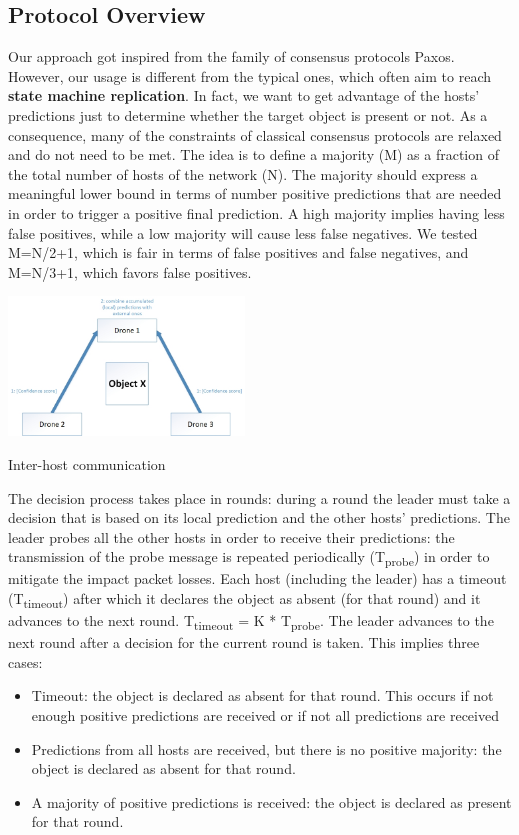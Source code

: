 \documentclass[10pt,conference,compsocconf]{IEEEtran}
\begin{document}
\subsection{Protocol Overview}
\label{subsec:protooverview}
Our approach got inspired from the family of consensus protocols Paxos. However, our usage is different from the typical ones, which often aim to reach \textbf{state machine replication}. In fact, we want to get advantage of the hosts' predictions just to determine whether the target object is present or not. As a consequence, many of the constraints of classical consensus protocols are relaxed and do not need to be met. The idea is to define a majority (M) as a fraction of the total number of hosts of the network (N). The majority should express a meaningful lower bound in terms of number positive predictions that are needed in order to trigger a positive final prediction. A high majority implies having less false positives, while a low majority will cause less false negatives. We tested M=N/2+1, which is fair in terms of false positives and false negatives, and M=N/3+1, which favors false positives.
\begin{center}
	\captionsetup{type=figure}
	\includegraphics[width=0.47\textwidth]{img/protocol_sketch_inter_host.jpg}
	\caption {Inter-host communication}
	\label{fig:inter_host}
\end{center}
The decision process takes place in rounds: during a round the leader must take a decision that is based on its local prediction and the other hosts' predictions. The leader probes all the other hosts in order to receive their predictions: the transmission of the probe message is repeated periodically (T\textsubscript{probe}) in order to mitigate the impact packet losses. Each host (including the leader) has a timeout (T\textsubscript{timeout}) after which it declares the object as absent (for that round) and it advances to the next round. T\textsubscript{timeout} = K * T\textsubscript{probe}. The leader advances to the next round after a decision for the current round is taken. This implies three cases:
\begin{itemize}
\item Timeout: the object is declared as absent for that round. This occurs if not enough positive predictions are received or if not all predictions are received
\item Predictions from all hosts are received, but there is no positive majority: the object is declared as absent for that round.
\item A majority of positive predictions is received: the object is declared as present for that round.
\end{itemize}
\end{document}
